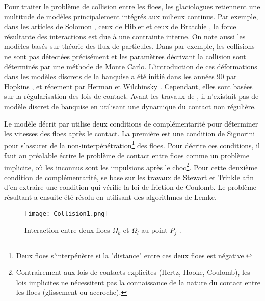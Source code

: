 Pour traiter le problème de collision entre les floes, les glaciologues retiennent une multitude de modèles principalement intégrés aux milieux continus. Par exemple, dans les articles de Solomon \parencite{solomon1970study}, ceux de Hibler \parencite{hibler1979dynamic} et ceux de Bratchie \parencite{bratchie1984rheology}, la force résultante des interactions est due à une contrainte interne. On note aussi les modèles basés sur théorie des flux de particules. Dans \parencite{shen1986applying,hopkins1985collisional} par exemple, les collisions ne sont pas détectées précisément et les paramètres décrivant la collision sont déterminés par une méthode de Monte Carlo. L'introduction de ces déformations dans les modèles discrets de la banquise a été initié dans les années 90 par Hopkins \parencite{hopkins1996mesoscale}, et récement par Herman et Wilchinsky \parencite{herman2011molecular,wilchinsky2010effect}. Cependant, elles sont basées sur la régularisation des lois de contact. Avant les travaux de \citeauthor{rabatel2015thesis}, il n'existait pas de modèle discret de banquise en utilisant une dynamique du contact non régulière.


Le modèle décrit par \parencite[p.5892]{rabatel2015dynamics} utilise deux conditions de complémentarité pour déterminer les vitesses des floes après le contact. La première est une condition de Signorini \parencite{signorini1933sopra} pour s'assurer de la non-interpénétration\footnote{Deux floes s'interpénètre si la "distance" entre ces deux floes est négative.} des floes. Pour décrire ces conditions, il faut au préalable écrire le problème de contact entre floes comme un problème implicite, où les inconnus sont les impulsions après le choc\footnote{Contrairement aux lois de contacts explicites (Hertz, Hooke, Coulomb), les lois implicites ne nécessitent pas la connaissance de la nature du contact entre les floes (glissement ou accroche).}. Pour cette deuxième condition de complémentarité, \citeauthor{rabatel2015thesis} se base sur les travaux de Stewart et Trinkle \parencite{stewart1996implicit} afin d'en extraire une condition qui vérifie la loi de friction de Coulomb. Le problème résultant a ensuite été résolu en utilisant des algorithmes de Lemke. 

\begin{figure}[!ht]
    \centering
    \texttt{[image: Collision1.png]}
    \caption{Interaction entre deux floes $\Omega_k$ et $\Omega_l$ au point $P_j$ \parencite[p.26]{rabatel2015thesis}.}
    \label{fig:Collision1}
\end{figure}

